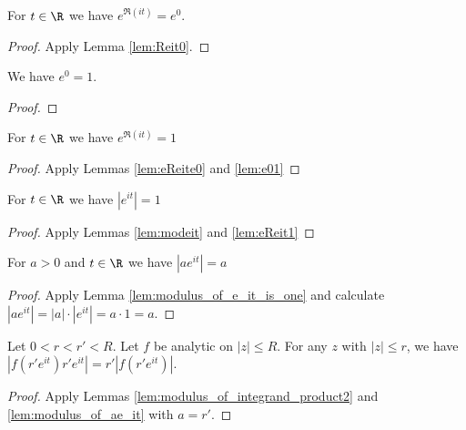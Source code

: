 

\begin{lemma}\label{lem:eReite0} \leanok
For $t\in\R$ we have $e^{\Re(it)} =e^0$.
\end{lemma}
\begin{proof}\leanok
{}
Apply Lemma \ref{lem:Reit0}.
\end{proof}


\begin{lemma} \label{lem:e01} \leanok
We have $e^0 = 1$.
\end{lemma}
\begin{proof}\leanok
\end{proof}


\begin{lemma} \label{lem:eReit1} \leanok
For $t\in\R$ we have  $e^{\Re(it)} = 1$
\end{lemma}
\begin{proof}\leanok
{}
Apply Lemmas \ref{lem:eReite0} and \ref{lem:e01}
\end{proof}


\begin{lemma}\label{lem:modulus_of_e_it_is_one} \leanok
For $t\in\R$ we have $|e^{it}| = 1$
\end{lemma}
\begin{proof}\leanok
{}
Apply Lemmas \ref{lem:modeit} and \ref{lem:eReit1}
\end{proof}


\begin{lemma}\label{lem:modulus_of_ae_it} \leanok
For $a>0$ and $t\in\R$ we have $|ae^{it}| = a$
\end{lemma}
\begin{proof}\leanok
{}
Apply Lemma \ref{lem:modulus_of_e_it_is_one} and calculate $|ae^{it}| = |a|\cdot|e^{it}| = a\cdot 1 = a$.
\end{proof}



\begin{lemma}\label{lem:modulus_of_integrand_product3} \leanok
Let $0 < r < r' < R$. Let $f$ be analytic on $|z| \le R$. For any $z$ with $|z| \le r$, we have
$|f(r'e^{it}) r'e^{it}| = r' |f(r'e^{it})|$.
\end{lemma}
\begin{proof}\leanok
{}
Apply Lemmas \ref{lem:modulus_of_integrand_product2} and  \ref{lem:modulus_of_ae_it} with $a=r'$.
\end{proof}

